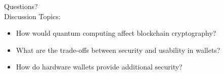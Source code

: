 \documentclass[8pt,aspectratio=169]{beamer}
\begin{document}
\begin{frame}[plain]
\vspace{3cm}
\begin{center}
{\Large Questions?}\\[2cm]
{\normalsize Discussion Topics:}\\[0.5cm]
{\small
\begin{itemize}
\item How would quantum computing affect blockchain cryptography?
\item What are the trade-offs between security and usability in wallets?
\item How do hardware wallets provide additional security?
\end{itemize}
}
\end{center}
\end{frame}
\end{document}
